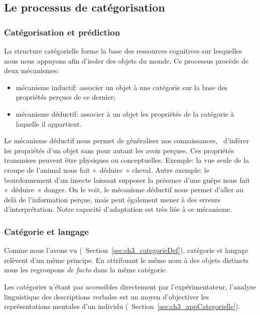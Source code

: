 \subsection{Le processus de catégorisation}
\label{sec:ch3_categoProcess}

\subsubsection{Catégorisation et prédiction}
\label{sec:ch3_categoPred}

La structure catégorielle forme la base des ressources cognitives sur lesquelles nous nous appuyons afin d'isoler des objets du monde. Ce processus procède de deux mécanismes:

\begin{itemize} 
\item mécanisme inductif: associer un objet à une catégorie sur la base des propriétés perçues de ce dernier;
\item mécanisme déductif: associer à un objet les propriétés de la catégorie à laquelle il appartient.
\end{itemize}

Le mécanisme déductif nous permet de généraliser nos connaissances, \ie~d'inférer les propriétés d'un objet sans pour autant les avoir perçues. Ces propriétés transmises peuvent être physiques ou conceptuelles. Exemple: la vue seule de la croupe de l'animal nous fait «~déduire~» cheval. Autre exemple: le bourdonnement d'un insecte laissant supposer la présence d'une guêpe nous fait «~déduire~» danger. On le voit, le mécanisme déductif nous permet d'aller au delà de l'information perçue, mais peut également mener à des erreurs d'interprétation. Notre capacité d’adaptation est très liée à ce mécanisme.

\subsubsection{Catégorie et langage}
\label{sec:ch3_catLang}

Comme nous l'avons vu (\cf~Section~\ref{sec:ch3_categorieDef}), catégorie et langage relèvent d'un même principe. En attribuant le même nom à des objets distincts nous les regroupons \emph{de facto} dans la même catégorie.

Les catégories n'étant pas accessibles directement par l'expérimentateur, l'analyse linguistique des descriptions verbales est un moyen d'objectiver les représentations mentales d'un individu (\cf~Section~\ref{sec:ch3_appCategorielle}).

